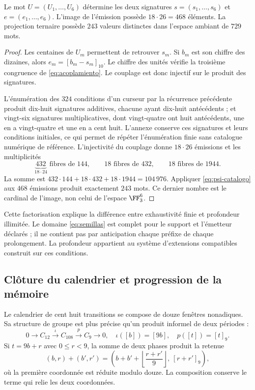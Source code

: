 \begin{proposition}
Le mot \(U=(U_1,\ldots,U_6)\) détermine les deux signatures \(s=(s_1,\ldots,s_6)\) et \(e=(e_1,\ldots,e_6)\). L’image de l’émission possède \(18\cdot26=468\) éléments. La projection ternaire possède \(243\) valeurs distinctes dans l’espace ambiant de \(729\) mots.
\end{proposition}
\begin{proof}
Les centaines de \(U_m\) permettent de retrouver \(s_m\). Si \(b_m\) est son chiffre des dizaines, alors \(e_m=[b_m-s_m]_{10}\). Le chiffre des unités vérifie la troisième congruence de \eqref{eq:acoplamiento}. Le couplage est donc injectif sur le produit des signatures.

L’énumération des \(324\) conditions d’un curseur par la récurrence précédente produit dix-huit signatures additives, chacune ayant dix-huit antécédents ; et vingt-six signatures multiplicatives, dont vingt-quatre ont huit antécédents, une en a vingt-quatre et une en a cent huit. L’annexe conserve ces signatures et leurs conditions initiales, ce qui permet de répéter l’énumération finie sans catalogue numérique de référence. L’injectivité du couplage donne \(18\cdot26\) émissions et les multiplicités
\[
 \underbrace{432}_{18\cdot24}\text{ fibres de }144,
 \qquad18\text{ fibres de }432,
 \qquad18\text{ fibres de }1944.
\]
La somme est \(432\cdot144+18\cdot432+18\cdot1944=104\,976\). Appliquer \eqref{eq:psi-catalogo} aux \(468\) émissions produit exactement \(243\) mots. Ce dernier nombre est le cardinal de l’image, non celui de l’espace \(\FF_3^6\).
\end{proof}

Cette factorisation explique la différence entre exhaustivité finie et profondeur illimitée. Le domaine \eqref{eq:semillas} est complet pour le support et l’émetteur déclarés ; il ne contient pas par anticipation chaque préfixe de chaque prolongement. La profondeur appartient au système d’extensions compatibles construit sur ces conditions.

\subsection{Clôture du calendrier et progression de la mémoire}

Le calendrier de cent huit transitions se compose de douze fenêtres nonadiques. Sa structure de groupe est plus précise qu’un produit informel de deux périodes :
\begin{equation}
 0\longrightarrow C_{12}\xrightarrow{\iota}C_{108}
 \xrightarrow{p}C_9\longrightarrow0,
 \quad\iota([b])=[9b],\quad p([t])=[t]_9.
 \label{eq:extension108}
\end{equation}
Si \(t=9b+r\) avec \(0\le r<9\), la somme de deux phases produit la retenue
\[
 (b,r)+(b',r')=
 \left(b+b'+\left\lfloor\frac{r+r'}9\right\rfloor,\ [r+r']_9\right),
\]
où la première coordonnée est réduite modulo douze. La composition conserve le terme qui relie les deux coordonnées.

